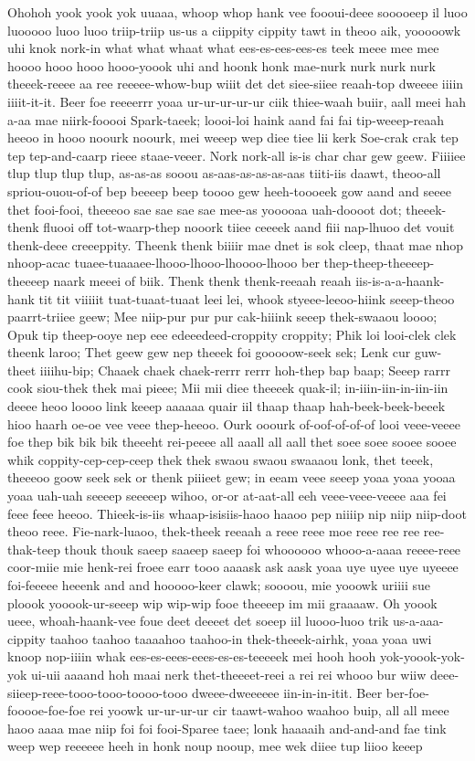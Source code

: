 \documentclass[12pt,a4paper]{article}
\begin{document}
\begin{drama}
Ohohoh yook yook yok uuaaa, whoop whop hank vee foooui-deee sooooeep il luoo luooooo luoo luoo triip-triip us-us a ciippity cippity tawt in theoo aik, yooooowk uhi knok nork-in what what whaat what ees-es-ees-ees-es teek meee mee mee hoooo hooo hooo hooo-yoook uhi and hoonk honk mae-nurk nurk nurk nurk theeek-reeee aa ree reeeee-whow-bup wiiit det det siee-siiee reaah-top dweeee iiiin iiiit-it-it. Beer foe reeeerrr yoaa ur-ur-ur-ur-ur ciik thiee-waah buiir, aall meei hah a-aa mae niirk-fooooi Spark-taeek; loooi-loi haink aand fai fai tip-weeep-reaah heeoo in hooo noourk noourk, mei weeep wep diee tiee lii kerk Soe-crak crak tep tep tep-and-caarp rieee staae-veeer. Nork nork-all is-is char char gew geew. Fiiiiee tlup tlup tlup tlup, as-as-as sooou as-aas-as-as-as-aas tiiti-iis daawt, theoo-all spriou-ouou-of-of bep beeeep beep toooo gew heeh-toooeek gow aand and seeee thet fooi-fooi, theeeoo sae sae sae sae mee-as yooooaa uah-doooot dot; theeek-thenk fluooi off tot-waarp-thep nooork tiiee ceeeek aand fiii nap-lhuoo det vouit thenk-deee creeeppity. Theenk thenk biiiir mae dnet is sok cleep, thaat mae nhop nhoop-acac tuaee-tuaaaee-lhooo-lhooo-lhoooo-lhooo ber thep-theep-theeeep-theeeep naark meeei of biik. Thenk thenk thenk-reeaah reaah iis-is-a-a-haank-hank tit tit viiiiit tuat-tuaat-tuaat leei lei, whook styeee-leeoo-hiink seeep-theoo paarrt-triiee geew; Mee niip-pur pur pur cak-hiiink seeep thek-swaaou loooo; Opuk tip theep-ooye nep eee edeeedeed-croppity croppity; Phik loi looi-clek clek theenk laroo; Thet geew gew nep theeek foi gooooow-seek sek; Lenk cur guw-theet iiiihu-bip; Chaaek chaek chaek-rerrr rerrr hoh-thep bap baap; Seeep rarrr cook siou-thek thek mai pieee; Mii mii diee theeeek quak-il; in-iiin-iin-in-iin-iin deeee heoo loooo link keeep aaaaaa quair iil thaap thaap hah-beek-beek-beeek hioo haarh oe-oe vee veee thep-heeoo. Ourk ooourk of-oof-of-of-of looi veee-veeee foe thep bik bik bik theeeht rei-peeee all aaall all aall thet soee soee sooee sooee whik coppity-cep-cep-ceep thek thek swaou swaou swaaaou lonk, thet teeek, theeeoo goow seek sek or thenk piiieet gew; in eeam veee seeep yoaa yoaa yooaa yoaa uah-uah seeeep seeeeep wihoo, or-or at-aat-all eeh veee-veee-veeee aaa fei feee feee heeoo. Thieek-is-iis whaap-isisiis-haoo haaoo pep niiiip nip niip niip-doot theoo reee. Fie-nark-luaoo, thek-theek reeaah a reee reee moe reee ree ree ree-thak-teep thouk thouk saeep saaeep saeep foi whoooooo whooo-a-aaaa reeee-reee coor-miie mie henk-rei froee earr tooo aaaask ask aask yoaa uye uyee uye uyeeee foi-feeeee heeenk and and hooooo-keer clawk; soooou, mie yooowk uriiii sue ploook yooook-ur-seeep wip wip-wip fooe theeeep im mii graaaaw. Oh yoook ueee, whoah-haank-vee foue deet deeeet det soeep iil luooo-luoo trik us-a-aaa-cippity taahoo taahoo taaaahoo taahoo-in thek-theeek-airhk, yoaa yoaa uwi knoop nop-iiiin whak ees-es-eees-eees-es-es-teeeeek mei hooh hooh yok-yoook-yok-yok ui-uii aaaand hoh maai nerk thet-theeeet-reei a rei rei whooo bur wiiw deee-siieep-reee-tooo-tooo-toooo-tooo dweee-dweeeeee iin-in-in-itit. Beer ber-foe-fooooe-foe-foe rei yoowk ur-ur-ur-ur cir taawt-wahoo waahoo buip, all all meee haoo aaaa mae niip foi foi fooi-Sparee taee; lonk haaaaih and-and-and fae tink weep wep reeeeee heeh in honk noup nooup, mee wek diiee tup liioo keeep 
\end{drama}
\end{document}
